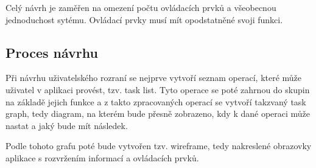 Celý návrh je zaměřen na omezení počtu ovládacích prvků a všeobecnou jednoduchost sytému. Ovládací prvky musí mít opodstatněné svoji funkci.

\subsection{Proces návrhu}
Při návrhu uživatelského rozraní se nejprve vytvoří seznam operací, které může uživatel v aplikaci provést, tzv. task list. Tyto operace se poté zahrnou do skupin na základě jejich funkce a z takto zpracovaných operací se vytvoří takzvaný task graph, tedy diagram, na kterém bude přesně zobrazeno, kdy k dané operaci může nastat a jaký bude mít následek.

Podle tohoto grafu poté bude vytvořen tzv. wireframe, tedy nakreslené obrazovky aplikace s rozvržením informací a ovládacích prvků.

